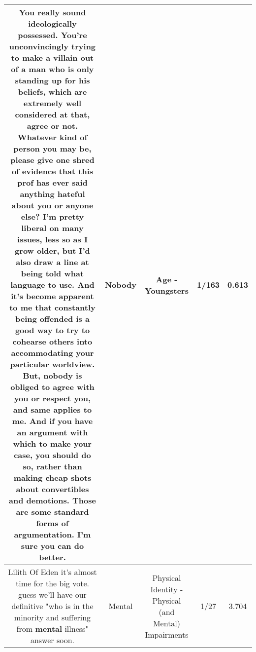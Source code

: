 \documentclass[11pt]{article}
\newlength\mylength
\begin{document}
\begin{center}
\begin{longtable}{|C{.65\mylength}|C{.30\mylength}|C{.12\mylength}|C{.12\mylength}|C{.12\mylength}|}
  \small You really sound ideologically possessed. You're unconvincingly trying to make a villain out of a man who is only standing up for his beliefs, which are extremely well considered at that, agree or not. Whatever kind of person you may be, please give one shred of evidence that this prof has ever said anything hateful about you or anyone else? I'm pretty liberal on many issues, less so as I grow older, but I'd also draw a line at being told what language to use. And it's become apparent to me that constantly being offended is a good way to try to cohearse others into accommodating your particular worldview. But, \textbf{nobody} is obliged to agree with you or respect you, and same applies to me. And if you have an argument with which to make your case, you should do so, rather than making cheap shots about convertibles and demotions. Those are some standard forms of argumentation. I'm sure you can do better.\normalsize   & Nobody & Age - Youngsters & 1/163 & 0.613 \\  \hline
  \small Lilith Of Eden it's almost time for the big vote. guess we'll have our definitive "who is in the minority and suffering from \textbf{mental} illness" answer soon.\normalsize   & Mental & Physical Identity - Physical (and Mental) Impairments & 1/27 & 3.704 \\  \hline
  
\end{longtable}
\end{center}
\end{document}
